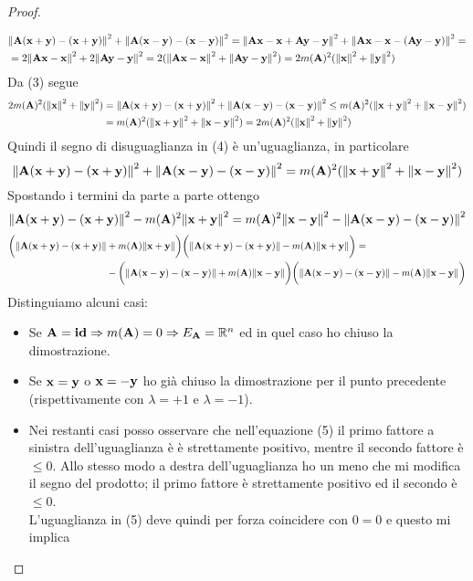 \documentclass[10pt,a4paper]{article}
\begin{document}
\begin{proof}
\begin{itemize}
\begin{equation} 
\begin{split}
& \norm{\vb{A(x+y) - (x+y)}}^2 + \norm{\vb{A(x-y) - (x-y)}}^2  = \norm{\vb{Ax - x + Ay -y}}^2 + \norm{\vb{Ax - x -(Ay -y)}}^2 = \\
& = 2 \norm{\vb{Ax-x}}^2 + 2 \norm{\vb{Ay -y}}^2  = 2( \norm{\vb{Ax-x}}^2 + \norm{\vb{Ay-y}}^2) = 2m(\vb{A})^2(\norm{\vb{x}}^2 + \norm{\vb{y}}^2) 
\end{split}
\end{equation}
Da (3) segue 
\begin{equation} 
\begin{split}
2m(\vb{A})^2(\norm{\vb{x}}^2 + \norm{\vb{y}}^2) & = \norm{\vb{A(x+y) - (x+y)}}^2 + \norm{\vb{A(x-y) - (x-y)}}^2 \leq m(\vb{A})^2(\norm{\vb{x+y}}^2 + \norm{\vb{x-y}}^2) \\ 
& = m(\vb{A})^2(\norm{\vb{x+y}}^2 + \norm{\vb{x-y}}^2)  = 2m(\vb{A})^2(\norm{\vb{x}}^2 + \norm{\vb{y}}^2)
\end{split}
\end{equation}
Quindi il segno di disuguaglianza in (4) è un'uguaglianza, in particolare 
\[   \norm{\vb{A(x+y) - (x+y)}}^2 + \norm{\vb{A(x-y) - (x-y)}}^2  = m(\vb{A})^2(\norm{\vb{x+y}}^2 + \norm{\vb{x-y}}^2)  \]
Spostando i termini da parte a parte ottengo
\[ \norm{\vb{A(x+y) - (x+y)}}^2 - m(\vb{A})^2 \norm{\vb{x+y}}^2=  m(\vb{A})^2 \norm{\vb{x-y}}^2 - \norm{\vb{A(x-y) - (x-y)}}^2 \]
\begin{equation} 
\begin{split}
\bigg( \norm{\vb{A(x+y) - (x+y)}} & + m(\vb{A})\norm{\vb{x+y}} \bigg) \bigg( \norm{\vb{A(x+y) - (x+y)}} - m(\vb{A}) \norm{\vb{x+y}} \bigg) = \\
& -\bigg( \norm{\vb{A(x-y) - (x-y)}} + m(\vb{A})\norm{\vb{x-y}} \bigg) \bigg( \norm{\vb{A(x-y) - (x-y)}} - m(\vb{A}) \norm{\vb{x-y}} \bigg)
\end{split}
\end{equation}
Distinguiamo alcuni casi: 
\begin{itemize}
\item Se $\vb{A} = \vb{id} \Rightarrow m(\vb{A}) = 0 \Rightarrow E_{\vb{A}} = \mathbb{R}^{n}$  ed in quel caso ho chiuso la dimostrazione.
\item Se $\vb{x} = \vb{y}$ o $\vb{x} = \vb{-y}$  ho già chiuso la dimostrazione per il punto precedente (rispettivamente con $\lambda = +1$ e $\lambda = -1$). 
\item Nei restanti casi posso osservare che nell'equazione (5) il primo fattore a sinistra dell'uguaglianza è è strettamente positivo, mentre il secondo fattore è $\leq 0 $. Allo stesso modo a destra dell'uguaglianza ho un meno che mi modifica il segno del prodotto; il primo fattore è strettamente positivo ed il secondo è $\leq 0 $. \\ L'uguaglianza in (5) deve quindi per forza coincidere con $0=0$ e questo mi implica 

\end{itemize}
\end{itemize}
\end{proof}
\end{document}
